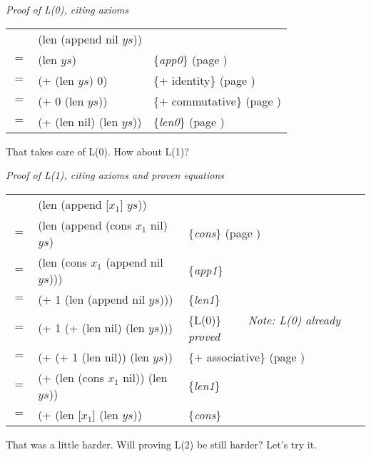\begin{center}
\emph{Proof of L(0), citing axioms} \\
\begin{tabular}{lll}
    & (len (append nil $ys$))  &                                                \\
$=$ & (len $ys$)               & \{\emph{app0}\}     (page \pageref{append-equations})\\
$=$ & (+ (len $ys$) 0)         & \{$+$ identity\}    (page \pageref{fig-02-01}) \\
$=$ & (+ 0 (len $ys$))         & \{$+$ commutative\} (page \pageref{fig-02-01}) \\
$=$ & (+ (len nil) (len $ys$)) & \{\emph{len0}\}     (page \pageref{len-equations})
\end{tabular}
\end{center}

That takes care of L(0). How about L(1)?

\begin{center}
\emph{Proof of L(1), citing axioms and proven equations} \\
\begin{tabular}{lll}
    & (len (append [$x_1$] $ys$))           &                     \\
$=$ & (len (append (cons $x_1$ nil) $ys$)   & \{\emph{cons}\} (page \pageref{first-rest-cons}) \\
$=$ & (len (cons $x_1$ (append nil $ys$)))  & \{\emph{app1}\}     \\
$=$ & (+ 1 (len (append nil $ys$)))         & \{\emph{len1}\}     \\
$=$ & (+ 1 (+ (len nil) (len $ys$)))        & \{L(0)\} ~~~~\emph{Note: L(0) already proved}\\
$=$ & (+ (+ 1 (len nil)) (len $ys$))        & \{$+$ associative\} (page \pageref{fig-02-01}) \\
$=$ & (+ (len (cons $x_1$ nil)) (len $ys$)) & \{\emph{len1}\}     \\
$=$ & (+ (len [$x_1$] (len $ys$))           & \{\emph{cons}\}     \\
\end{tabular}
\end{center}

That was a little harder. Will proving L(2) be still harder? Let's try it.

